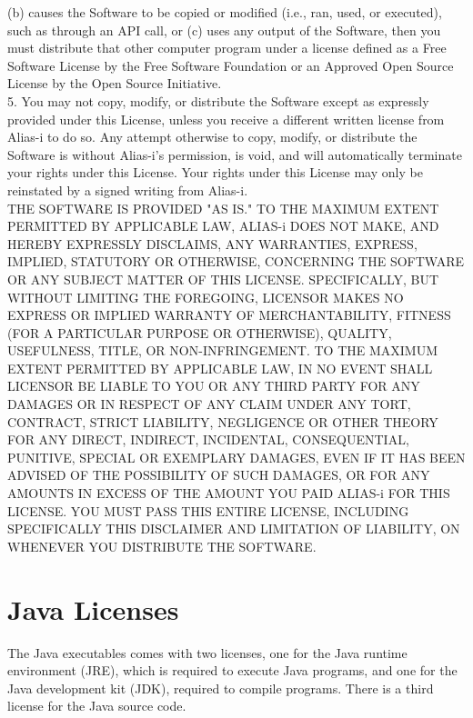 {(b) causes the Software to be copied or modified (i.e., ran, used, or
executed), such as through an API call, or (c) uses any output of the
Software, then you must distribute that other computer program under a
license defined as a Free Software License by the Free Software
Foundation or an Approved Open Source License by the Open Source
Initiative.
\\[8pt]
5. You may not copy, modify, or distribute the Software except as
expressly provided under this License, unless you receive a different
written license from Alias-i to do so.  Any attempt otherwise to copy,
modify, or distribute the Software is without Alias-i's permission, is
void, and will automatically terminate your rights under this License.
Your rights under this License may only be reinstated by a signed
writing from Alias-i.
\\[8pt]
THE SOFTWARE IS PROVIDED "AS IS." TO THE MAXIMUM EXTENT PERMITTED BY
APPLICABLE LAW, ALIAS-i DOES NOT MAKE, AND HEREBY EXPRESSLY DISCLAIMS,
ANY WARRANTIES, EXPRESS, IMPLIED, STATUTORY OR OTHERWISE, CONCERNING
THE SOFTWARE OR ANY SUBJECT MATTER OF THIS LICENSE.  SPECIFICALLY, BUT
WITHOUT LIMITING THE FOREGOING, LICENSOR MAKES NO EXPRESS OR IMPLIED
WARRANTY OF MERCHANTABILITY, FITNESS (FOR A PARTICULAR PURPOSE OR
OTHERWISE), QUALITY, USEFULNESS, TITLE, OR NON-INFRINGEMENT.  TO THE
MAXIMUM EXTENT PERMITTED BY APPLICABLE LAW, IN NO EVENT SHALL LICENSOR
BE LIABLE TO YOU OR ANY THIRD PARTY FOR ANY DAMAGES OR IN RESPECT OF
ANY CLAIM UNDER ANY TORT, CONTRACT, STRICT LIABILITY, NEGLIGENCE OR
OTHER THEORY FOR ANY DIRECT, INDIRECT, INCIDENTAL, CONSEQUENTIAL,
PUNITIVE, SPECIAL OR EXEMPLARY DAMAGES, EVEN IF IT HAS BEEN ADVISED OF
THE POSSIBILITY OF SUCH DAMAGES, OR FOR ANY AMOUNTS IN EXCESS OF THE
AMOUNT YOU PAID ALIAS-i FOR THIS LICENSE.  YOU MUST PASS THIS ENTIRE
LICENSE, INCLUDING SPECIFICALLY THIS DISCLAIMER AND LIMITATION OF
LIABILITY, ON WHENEVER YOU DISTRIBUTE THE SOFTWARE.
}



\section{Java Licenses}

\setlength{\baselineskip}{\oldbaselineskip}
\noindent
The Java executables comes with two licenses, one for the Java runtime environment
(JRE), which is required to execute Java programs, and one for the
Java development kit (JDK), required to compile programs.  There is a third
license for the Java source code.

